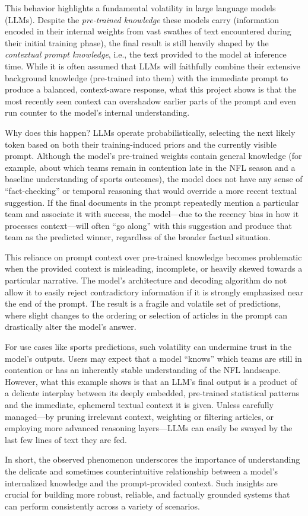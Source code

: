 This behavior highlights a fundamental volatility in large language models (LLMs). Despite the \emph{pre-trained knowledge} these models carry (information encoded in their internal weights from vast swathes of text encountered during their initial training phase), the final result is still heavily shaped by the \emph{contextual prompt knowledge}, i.e., the text provided to the model at inference time. While it is often assumed that LLMs will faithfully combine their extensive background knowledge (pre-trained into them) with the immediate prompt to produce a balanced, context-aware response, what this project shows is that the most recently seen context can overshadow earlier parts of the prompt and even run counter to the model’s internal understanding.

Why does this happen? LLMs operate probabilistically, selecting the next likely token based on both their training-induced priors and the currently visible prompt. Although the model’s pre-trained weights contain general knowledge (for example, about which teams remain in contention late in the NFL season and a baseline understanding of sports outcomes), the model does not have any sense of “fact-checking” or temporal reasoning that would override a more recent textual suggestion. If the final documents in the prompt repeatedly mention a particular team and associate it with success, the model—due to the recency bias in how it processes context—will often “go along” with this suggestion and produce that team as the predicted winner, regardless of the broader factual situation.

This reliance on prompt context over pre-trained knowledge becomes problematic when the provided context is misleading, incomplete, or heavily skewed towards a particular narrative. The model’s architecture and decoding algorithm do not allow it to easily reject contradictory information if it is strongly emphasized near the end of the prompt. The result is a fragile and volatile set of predictions, where slight changes to the ordering or selection of articles in the prompt can drastically alter the model’s answer.

For use cases like sports predictions, such volatility can undermine trust in the model’s outputs. Users may expect that a model “knows” which teams are still in contention or has an inherently stable understanding of the NFL landscape. However, what this example shows is that an LLM’s final output is a product of a delicate interplay between its deeply embedded, pre-trained statistical patterns and the immediate, ephemeral textual context it is given. Unless carefully managed—by pruning irrelevant context, weighting or filtering articles, or employing more advanced reasoning layers—LLMs can easily be swayed by the last few lines of text they are fed.

In short, the observed phenomenon underscores the importance of understanding the delicate and sometimes counterintuitive relationship between a model’s internalized knowledge and the prompt-provided context. Such insights are crucial for building more robust, reliable, and factually grounded systems that can perform consistently across a variety of scenarios.  


